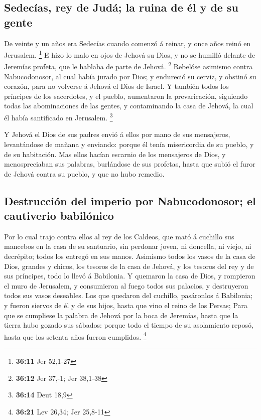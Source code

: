 \hypertarget{sedecuxedas-rey-de-juduxe1-la-ruina-de-uxe9l-y-de-su-gente}{%
\subsection{Sedecías, rey de Judá; la ruina de él y de su
gente}\label{sedecuxedas-rey-de-juduxe1-la-ruina-de-uxe9l-y-de-su-gente}}

 De veinte y un años era Sedecías cuando comenzó á
reinar, y once años reinó en Jerusalem. \footnote{\textbf{36:11} Jer
  52,1-27}  E hizo lo malo en ojos de Jehová su Dios, y
no se humilló delante de Jeremías profeta, que le hablaba de parte de
Jehová. \footnote{\textbf{36:12} Jer 37,-1; Jer 38,1-38} 
Rebelóse asimismo contra Nabucodonosor, al cual había jurado por Dios; y
endureció su cerviz, y obstinó su corazón, para no volverse á Jehová el
Dios de Israel.  Y también todos los príncipes de los
sacerdotes, y el pueblo, aumentaron la prevaricación, siguiendo todas
las abominaciones de las gentes, y contaminando la casa de Jehová, la
cual él había santificado en Jerusalem. \footnote{\textbf{36:14} Deut
  18,9}

 Y Jehová el Dios de sus padres envió á ellos por mano de
sus mensajeros, levantándose de mañana y enviando: porque él tenía
misericordia de su pueblo, y de su habitación.  Mas ellos
hacían escarnio de los mensajeros de Dios, y menospreciaban sus
palabras, burlándose de sus profetas, hasta que subió el furor de Jehová
contra su pueblo, y que no hubo remedio.

\hypertarget{destrucciuxf3n-del-imperio-por-nabucodonosor-el-cautiverio-babiluxf3nico}{%
\subsection{Destrucción del imperio por Nabucodonosor; el cautiverio
babilónico}\label{destrucciuxf3n-del-imperio-por-nabucodonosor-el-cautiverio-babiluxf3nico}}

 Por lo cual trajo contra ellos al rey de los Caldeos,
que mató á cuchillo sus mancebos en la casa de su santuario, sin
perdonar joven, ni doncella, ni viejo, ni decrépito; todos los entregó
en sus manos.  Asimismo todos los vasos de la casa de
Dios, grandes y chicos, los tesoros de la casa de Jehová, y los tesoros
del rey y de sus príncipes, todo lo llevó á Babilonia.  Y
quemaron la casa de Dios, y rompieron el muro de Jerusalem, y
consumieron al fuego todos sus palacios, y destruyeron todos sus vasos
deseables.  Los que quedaron del cuchillo, pasáronlos á
Babilonia; y fueron siervos de él y de sus hijos, hasta que vino el
reino de los Persas;  Para que se cumpliese la palabra de
Jehová por la boca de Jeremías, hasta que la tierra hubo gozado sus
sábados: porque todo el tiempo de su asolamiento reposó, hasta que los
setenta años fueron cumplidos. \footnote{\textbf{36:21} Lev 26,34; Jer
  25,8-11}

